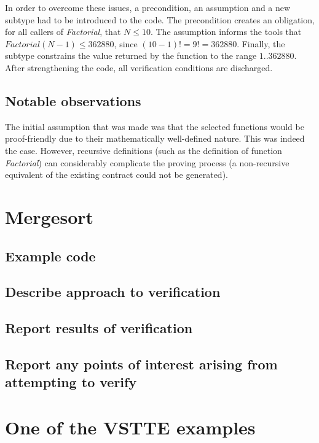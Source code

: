 \documentclass{llncs}
\begin{document}
In order to overcome these issues, a precondition, an assumption and a new
subtype had to be introduced to the code. The precondition creates an obligation,
for all callers of \emph{Factorial}, that $N \leq 10$. The assumption informs the tools
that $Factorial (N - 1) \leq 362880$, since $(10 - 1)! = 9! = 362880$. Finally, the
subtype constrains the value returned by the function to the range $1 .. 362880$.
After strengthening the code, all verification conditions are discharged.




\subsection{Notable observations}
The initial assumption that was made was that the selected functions would be
proof-friendly due to their mathematically well-defined nature. This was indeed
the case. However, recursive definitions (such as the definition of function
\emph{Factorial}) can considerably complicate the proving process (a non-recursive
equivalent of the existing contract could not be generated).

\section{Mergesort}
\subsection{Example code}
\subsection{Describe approach to verification}
\subsection{Report results of verification}
\subsection{Report any points of interest arising from attempting to verify}

\section{One of the VSTTE examples}
\end{document}
